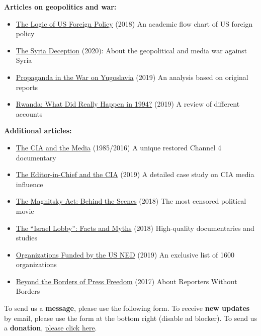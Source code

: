 \textbf{Articles on geopolitics and war:}

\begin{itemize}
\tightlist
\item
  \href{https://swprs.org/us-foreign-policy/}{The Logic of US Foreign
  Policy} (2018) An academic flow chart of US foreign policy
\item
  \href{https://swprs.org/the-syria-deception/}{The Syria Deception}
  (2020): About the geopolitical and media war against Syria
\item
  \href{https://swprs.org/propaganda-in-the-war-on-yugoslavia/}{Propaganda
  in the War on Yugoslavia} (2019) An analysis based on original reports
\item
  \href{https://swprs.org/rwanda-what-did-really-happen-in-1994/}{Rwanda:
  What Did Really Happen in 1994?} (2019) A review of different accounts
\end{itemize}

\textbf{Additional articles:}

\begin{itemize}
\tightlist
\item
  \href{https://swprs.org/video-the-cia-and-the-media/}{The CIA and the
  Media} (1985/2016) A unique restored Channel 4 documentary
\item
  \href{https://swprs.org/the-editor-in-chief-and-the-cia/}{The
  Editor-in-Chief and the CIA} (2019) A detailed case study on CIA media
  influence
\item
  \href{https://swprs.org/the-magnitsky-act/}{The Magnitsky Act: Behind
  the Scenes} (2018) The most censored political movie
\item
  \href{https://swprs.org/the-israel-lobby-facts-and-myths/}{The
  ``Israel Lobby'': Facts and Myths} (2018) High-quality documentaries
  and studies
\item
  \href{https://swprs.org/organizations-funded-by-the-ned/}{Organizations
  Funded by the US NED} (2019) An exclusive list of 1600 organizations
\item
  \href{https://swprs.org/beyond-the-borders-of-press-freedom/}{Beyond
  the Borders of Press Freedom} (2017) About Reporters Without Borders
\end{itemize}

To send us a \textbf{message}, please use the following form. To receive
\textbf{new updates} by email, please use the form at the bottom right
(disable ad blocker). To send us a \textbf{donation},
\href{https://swprs.org/donations/}{please click here}.

